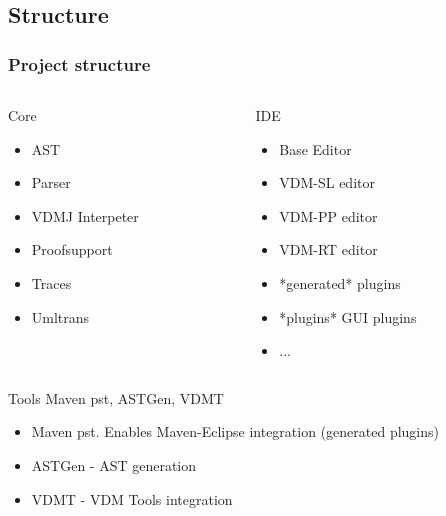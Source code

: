 \subsection{Structure}
\frame
{
  \frametitle{Project structure}

\begin{columns}
\begin{column}{5cm}
	\begin{block}{Core}
		\begin{itemize}
			\item AST
			\item Parser
			\item VDMJ Interpeter
			\item Proofsupport
			\item Traces
			\item Umltrans
		\end{itemize}
	 \end{block}
\end{column}
\begin{column}{5cm}
\pause
	\begin{block}{IDE}
		\begin{itemize}
			\item Base Editor
			\item VDM-SL editor
			\item VDM-PP editor
			\item VDM-RT editor
			\item *generated* plugins
			\item *plugins* GUI plugins
			\item ...
		\end{itemize}
		
	\end{block}
\end{column}
\end{columns}
\pause
\begin{block}{Tools}
	Maven pst, ASTGen, VDMT
\end{block}

}

\note
{
\begin{itemize}
		\item Maven pst. Enables Maven-Eclipse integration (generated plugins)
		\item ASTGen - AST generation
		\item VDMT - VDM Tools integration
\end{itemize}

}

